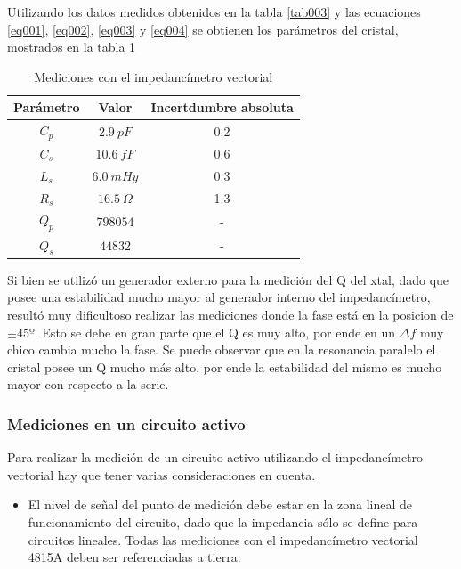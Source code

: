 \documentclass[a4paper,10pt]{article}
\begin{document}
		\indent Utilizando los datos medidos obtenidos en la tabla \ref{tab003}
		y las ecuaciones \ref{eq001}, \ref{eq002}, \ref{eq003} y \ref{eq004} se
		obtienen los parámetros del cristal, mostrados en la tabla \ref{tab004}
		
		\begin{table}[!htp]
			\centering
			\begin{tabular}{|c|c|c|}
				\hline
				Parámetro & Valor & Incertdumbre absoluta \\
				\hline
				$C_p$ & $2.9~pF$ & 0.2 \\
				\hline
				$C_s$ & $10.6~fF$ & 0.6 \\ 
				\hline
				$L_s$ & $6.0~mHy$ & 0.3 \\
				\hline
				$R_s$ & $16.5~\Omega$ & 1.3 \\ 
				\hline									
				$Q_p$ & $798054$ & - \\
				\hline
				$Q_s$ & $44832$  & - \\
				\hline
			\end{tabular}
			\caption{Mediciones con el impedancímetro vectorial} \label{tab004}
		\end{table}	

		\indent Si bien se utilizó un generador externo para la medición del Q 
		del xtal, dado que posee una estabilidad mucho mayor al generador 
		interno del impedancímetro, resultó muy dificultoso realizar las 
		mediciones donde la fase está en la posicion de $\pm45º$. Esto se debe 
		en gran parte que el Q es muy alto, por ende en un $\Delta f$ muy chico 
		cambia mucho la fase. Se puede observar que en la resonancia paralelo el
		cristal posee un Q mucho más alto, por ende la estabilidad del mismo es 
		mucho mayor con respecto a la serie.

		\subsubsection{Mediciones en un circuito activo}
		
		\indent Para realizar la medición de un circuito activo utilizando el 
		impedancímetro vectorial hay que tener varias consideraciones en cuenta.
		
		\begin{itemize}
			\item El nivel de señal del punto de medición debe estar en la zona 
			lineal de funcionamiento del circuito, dado que la impedancia sólo 
			se define para circuitos lineales.
			\indent Todas las mediciones con el impedancímetro vectorial 4815A 
			deben ser referenciadas a tierra.
		\end{itemize}
		
\end{document}
